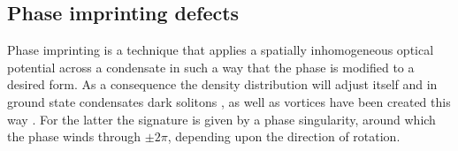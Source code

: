 
\subsection{Phase imprinting defects}
Phase imprinting is a technique that applies a spatially inhomogeneous optical potential across a condensate in such a way that the phase is modified to a desired form. As a consequence the density distribution will adjust itself and in ground state condensates dark solitons \cite{BEC:Denschlag_science_2000}, as well as vortices have been created this way \cite{Vtx:Dobrek_pra_1999}. For the latter the signature is given by a phase singularity, around which the phase winds through $\pm 2\pi$, depending upon the direction of rotation.

